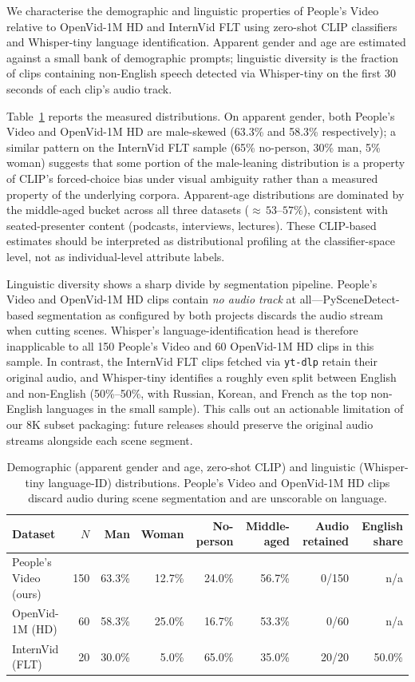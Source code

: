 \documentclass{article}
\begin{document}
We characterise the demographic and linguistic properties of People's Video relative to OpenVid-1M HD and InternVid FLT using zero-shot CLIP classifiers and Whisper-tiny language identification. Apparent gender and age are estimated against a small bank of demographic prompts; linguistic diversity is the fraction of clips containing non-English speech detected via Whisper-tiny on the first 30 seconds of each clip's audio track.

Table~\ref{tab:diversity_stats} reports the measured distributions. On apparent gender, both People's Video and OpenVid-1M HD are male-skewed (63.3\% and 58.3\% respectively); a similar pattern on the InternVid FLT sample (65\% no-person, 30\% man, 5\% woman) suggests that some portion of the male-leaning distribution is a property of CLIP's forced-choice bias under visual ambiguity rather than a measured property of the underlying corpora. Apparent-age distributions are dominated by the middle-aged bucket across all three datasets (${\approx}\,53$--$57\%$), consistent with seated-presenter content (podcasts, interviews, lectures). These CLIP-based estimates should be interpreted as distributional profiling at the classifier-space level, not as individual-level attribute labels.

Linguistic diversity shows a sharp divide by segmentation pipeline. People's Video and OpenVid-1M HD clips contain \emph{no audio track} at all---PySceneDetect-based segmentation as configured by both projects discards the audio stream when cutting scenes. Whisper's language-identification head is therefore inapplicable to all 150 People's Video and 60 OpenVid-1M HD clips in this sample. In contrast, the InternVid FLT clips fetched via \texttt{yt-dlp} retain their original audio, and Whisper-tiny identifies a roughly even split between English and non-English (50\%--50\%, with Russian, Korean, and French as the top non-English languages in the small sample). This calls out an actionable limitation of our 8K subset packaging: future releases should preserve the original audio streams alongside each scene segment.

\begin{table}[t]
\centering
\caption{Demographic (apparent gender and age, zero-shot CLIP) and linguistic (Whisper-tiny language-ID) distributions. People's Video and OpenVid-1M HD clips discard audio during scene segmentation and are unscorable on language.}
\label{tab:diversity_stats}
\begin{tabular}{lrrrrrrr}
\toprule
Dataset & $N$ & Man & Woman & No-person & Middle-aged & Audio retained & English share \\
\midrule
People's Video (ours) & 150 & 63.3\% & 12.7\% & 24.0\% & 56.7\% & 0/150 & n/a \\
OpenVid-1M (HD)       & 60  & 58.3\% & 25.0\% & 16.7\% & 53.3\% & 0/60  & n/a \\
InternVid (FLT)       & 20  & 30.0\% & \phantom{0}5.0\% & 65.0\% & 35.0\% & 20/20 & 50.0\% \\
\bottomrule
\end{tabular}
\end{table}
\end{document}
